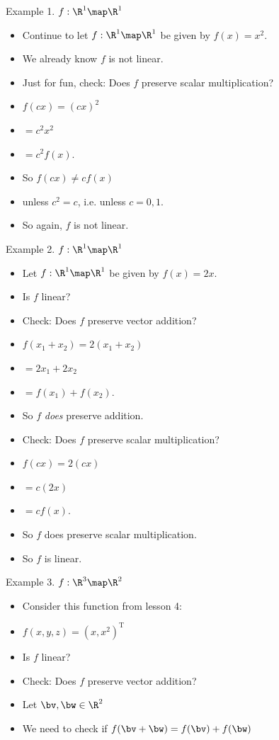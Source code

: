 \documentclass{beamer}
\begin{document}
\begin{frame}{Example 1. $f:\R^1\map\R^1$}

\begin{itemize}
\item Continue to let $f:\R^1\map\R^1$ be given by $f(x) = x^2$.
\item We already know $f$ is not linear.
\item Just for fun, check: Does $f$ preserve scalar multiplication?
\item $f(c x) = (c x)^2$
\item $= c^2 x^2$
\item $= c^2 f(x)$.
\item So $f(c x) \not= c f(x)$
\item unless $c^2 = c$, i.e. unless $c=0, 1$.
\item So again, $f$ is not linear.
\end{itemize}

\end{frame}

\begin{frame}{Example 2. $f:\R^1\map\R^1$}

\begin{itemize}
\item Let $f:\R^1\map\R^1$ be given by $f(x) = 2 x$.
\item Is $f$ linear?
\item Check: Does $f$ preserve vector addition?
\item $f(x_1 + x_2) =  2(x_1 + x_2)$
\item $ = 2 x_1 + 2 x_2$
\item $= f(x_1) + f(x_2)$.
\item So $f$ \emph{does} preserve addition.
\item Check: Does $f$ preserve scalar multiplication?
\item $f(c x) = 2 (c x)$
\item $ = c (2 x) $
\item $= c f(x)$.
\item So $f$ does preserve scalar multiplication.
\item So $f$ is linear.
\end{itemize}

\end{frame}

\begin{frame}{Example 3. $f:\R^3\map\R^2$}

\begin{itemize}
\item Consider this function from lesson 4:
\item $f(x,y,z) = (x, x^2)^{\text{T}}$
\item Is $f$ linear?
\item Check: Does $f$ preserve vector addition?
\item Let $\bv, \bw \in \R^2$
\item We need to check if $f(\bv + \bw) = f(\bv) + f(\bw)$
\end{itemize}

\end{frame}
\end{document}
